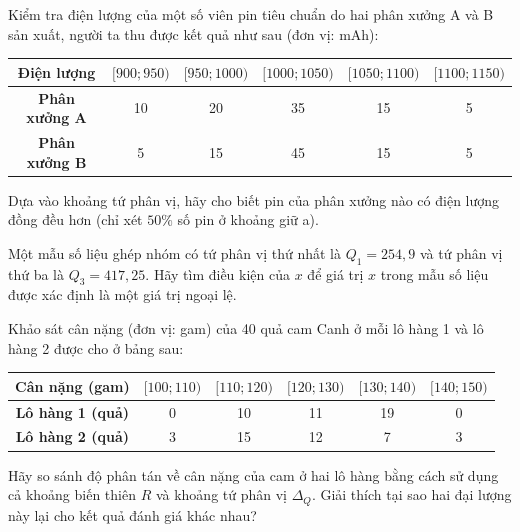 \documentclass[12pt]{article}
\begin{document}
	\begin{btvang}[title={Bài 3}]
		Kiểm tra điện lượng của một số viên pin tiêu chuẩn do hai phân xưởng A và B sản xuất, người ta thu được kết quả như sau (đơn vị: mAh):
		\begin{center}
			\renewcommand{\arraystretch}{1.3}
			\begin{tabular}{|c|c|c|c|c|c|}
				\hline
				\textbf{Điện lượng} & $[900; 950)$ & $[950; 1000)$ & $[1000; 1050)$ & $[1050; 1100)$ & $[1100; 1150)$ \\
				\hline
				\textbf{Phân xưởng A} & 10 & 20 & 35 & 15 & 5 \\
				\hline
				\textbf{Phân xưởng B} & 5 & 15 & 45 & 15 & 5 \\
				\hline
			\end{tabular}
		\end{center}
		Dựa vào khoảng tứ phân vị, hãy cho biết pin của phân xưởng nào có điện lượng đồng đều hơn (chỉ xét $50\%$ số pin ở khoảng giữ a).
	\end{btvang}
	
	\begin{btvang}[title={Bài 4}]
		Một mẫu số liệu ghép nhóm có tứ phân vị thứ nhất là $Q_1 = 254,9$ và tứ phân vị thứ ba là $Q_3 = 417,25$. 
		Hãy tìm điều kiện của $x$ để giá trị $x$ trong mẫu số liệu được xác định là một giá trị ngoại lệ.
	\end{btvang}
	
	\begin{btdo}[title={Bài 5}]
		Khảo sát cân nặng (đơn vị: gam) của 40 quả cam Canh ở mỗi lô hàng 1 và lô hàng 2 được cho ở bảng sau:
		\begin{center}
			\renewcommand{\arraystretch}{1.3}
			\begin{tabular}{|c|c|c|c|c|c|}
				\hline
				\textbf{Cân nặng (gam)} & $[100; 110)$ & $[110; 120)$ & $[120; 130)$ & $[130; 140)$ & $[140; 150)$ \\
				\hline
				\textbf{Lô hàng 1 (quả)} & 0 & 10 & 11 & 19 & 0 \\
				\hline
				\textbf{Lô hàng 2 (quả)} & 3 & 15 & 12 & 7 & 3 \\
				\hline
			\end{tabular}
		\end{center}
		Hãy so sánh độ phân tán về cân nặng của cam ở hai lô hàng bằng cách sử dụng cả khoảng biến thiên $R$ và khoảng tứ phân vị $\Delta_Q$. Giải thích tại sao hai đại lượng này lại cho kết quả đánh giá khác nhau?
	\end{btdo}
	
\end{document}
